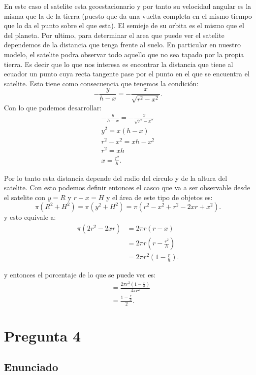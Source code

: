 \documentclass[12pt]{article}
\begin{document}
En este caso el satelite esta geoestacionario y por tanto su velocidad angular es la misma que la de la tierra (puesto que da una vuelta completa en el mismo tiempo que lo da el punto sobre el que esta). El semieje de su orbita es el mismo que el del planeta. Por ultimo, para determinar el area que puede ver el satelite dependemos de la distancia que tenga frente al suelo. En particular en nuestro modelo, el satelite podra observar todo aquello que no sea tapado por la propia tierra. Es decir que lo que nos interesa es encontrar la distancia que tiene al ecuador un punto cuya recta tangente pase por el punto en el que se encuentra el satelite. Esto tiene como consecuencia que tenemos la condición: \[
-\frac{y}{h-x}=-\frac{x}{\sqrt{r^2-x^2} }
.\] Con lo que podemos desarrollar: 
\begin{align*}
-\frac{y}{h-x}=-\frac{x}{\sqrt{r^2-x^2} }\\
y^2 = x\left( h-x \right) \\
r^2 - x^2 = xh - x^2\\
r^2 = xh \\
x = \frac{r^2}{h}
.\end{align*}

Por lo tanto esta distancia depende del radio del circulo y de la altura del satelite. Con esto podemos definir entonces el casco que va a ser observable desde el satelite con $y=R$ y $r-x = H$ y el área de este tipo de objetos es: \[
  \pi \left( R^2 + H^2 \right) = \pi\left( y^2 + H^2 \right) = \pi\left( r^2 - x^2 + r^2 - 2xr + x^2 \right) 
.\] y esto equivale a:
\begin{align*}
  \pi\left( 2r^2 - 2xr \right) &= 2\pi r \left( r - x \right)  \\
  &= 2\pi r \left( r - \frac{r^2}{h} \right)  \\
  &= 2\pi r^2 \left( 1 - \frac{r}{h} \right)
.\end{align*}

y entonces el porcentaje de lo que se puede ver es:
\begin{align*}
  &= \frac{2\pi r^2\left( 1 - \frac{r}{h} \right) }{4\pi r^2} \\
  &= \frac{1-\frac{r}{h}}{2}
.\end{align*}



\section*{Pregunta 4}

\subsection*{Enunciado}
\end{document}
